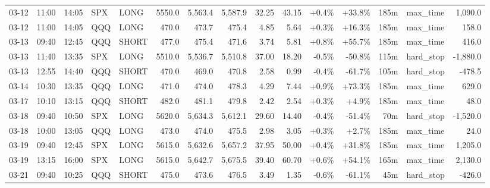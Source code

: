 \documentclass[11pt,a4paper,twoside]{article}
\begin{document}
\begin{landscape}
\begin{center}
\begin{longtable}{>{\color{txtmain}}l l l l l r r r r r r r r >{\color{txtmain}}l r}
03-12 & 11:00 & 14:05 & SPX & LONG & 5550.0 & 5,563.4 & 5,587.9 & 32.25 & 43.15 & \textcolor{wingreen}{+0.4\%} & \textcolor{wingreen}{+33.8\%} & 185m & max\_time & \textcolor{wingreen}{1,090.0} \\
03-12 & 11:00 & 14:05 & QQQ & LONG & 470.0 & 473.7 & 475.4 & 4.85 & 5.64 & \textcolor{wingreen}{+0.3\%} & \textcolor{wingreen}{+16.3\%} & 185m & max\_time & \textcolor{wingreen}{158.0} \\
03-13 & 09:40 & 12:45 & QQQ & SHORT & 477.0 & 475.4 & 471.6 & 3.74 & 5.81 & \textcolor{wingreen}{+0.8\%} & \textcolor{wingreen}{+55.7\%} & 185m & max\_time & \textcolor{wingreen}{416.0} \\
03-13 & 11:40 & 13:35 & SPX & LONG & 5510.0 & 5,536.7 & 5,510.8 & 37.00 & 18.20 & \textcolor{lossred}{-0.5\%} & \textcolor{lossred}{-50.8\%} & 115m & hard\_stop & \textcolor{lossred}{-1,880.0} \\
03-13 & 12:55 & 14:40 & QQQ & SHORT & 470.0 & 469.0 & 470.8 & 2.58 & 0.99 & \textcolor{lossred}{-0.4\%} & \textcolor{lossred}{-61.7\%} & 105m & hard\_stop & \textcolor{lossred}{-478.5} \\
03-14 & 10:30 & 13:35 & QQQ & LONG & 471.0 & 474.0 & 478.3 & 4.29 & 7.44 & \textcolor{wingreen}{+0.9\%} & \textcolor{wingreen}{+73.3\%} & 185m & max\_time & \textcolor{wingreen}{629.0} \\
03-17 & 10:10 & 13:15 & QQQ & SHORT & 482.0 & 481.1 & 479.8 & 2.42 & 2.54 & \textcolor{wingreen}{+0.3\%} & \textcolor{wingreen}{+4.9\%} & 185m & max\_time & \textcolor{wingreen}{48.0} \\
03-18 & 09:40 & 10:50 & SPX & LONG & 5620.0 & 5,634.3 & 5,612.1 & 29.60 & 14.40 & \textcolor{lossred}{-0.4\%} & \textcolor{lossred}{-51.4\%} & 70m & hard\_stop & \textcolor{lossred}{-1,520.0} \\
03-18 & 10:00 & 13:05 & QQQ & LONG & 473.0 & 474.0 & 475.5 & 2.98 & 3.05 & \textcolor{wingreen}{+0.3\%} & \textcolor{wingreen}{+2.7\%} & 185m & max\_time & \textcolor{wingreen}{24.0} \\
03-19 & 09:40 & 12:45 & SPX & LONG & 5615.0 & 5,632.6 & 5,657.2 & 37.95 & 50.00 & \textcolor{wingreen}{+0.4\%} & \textcolor{wingreen}{+31.8\%} & 185m & max\_time & \textcolor{wingreen}{1,205.0} \\
03-19 & 13:15 & 16:00 & SPX & LONG & 5615.0 & 5,642.7 & 5,675.5 & 39.40 & 60.70 & \textcolor{wingreen}{+0.6\%} & \textcolor{wingreen}{+54.1\%} & 165m & max\_time & \textcolor{wingreen}{2,130.0} \\
03-21 & 09:40 & 10:25 & QQQ & SHORT & 475.0 & 473.6 & 476.5 & 3.49 & 1.35 & \textcolor{lossred}{-0.6\%} & \textcolor{lossred}{-61.1\%} & 45m & hard\_stop & \textcolor{lossred}{-426.0} \\

\end{longtable}
\end{center}
\end{landscape}
\end{document}
